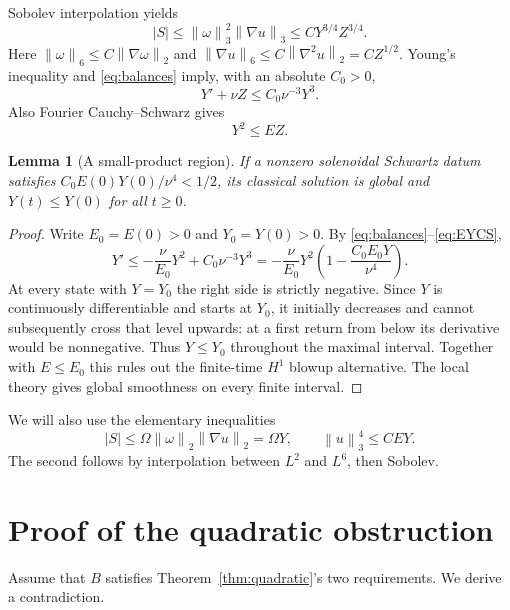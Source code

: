 \documentclass[11pt]{article}
\newtheorem{lemma}[theorem]{Lemma}
\theoremstyle{remark}
\newcommand{\norm}[1]{\left\lVert#1\right\rVert}
\begin{document}
Sobolev interpolation yields
\begin{equation}
 |S|\le \norm\omega_3^2\norm{\nabla u}_3
       \le C Y^{3/4}Z^{3/4}.
\end{equation}
Here $\norm\omega_6\le C\norm{\nabla\omega}_2$ and
$\norm{\nabla u}_6\le C\norm{\nabla^2u}_2=C Z^{1/2}$.
Young's inequality and \eqref{eq:balances} imply, with an absolute $C_0>0$,
\begin{equation}
 Y'+\nu Z\le C_0\nu^{-3}Y^3.\label{eq:enstrophy-inequality}
\end{equation}
Also Fourier Cauchy--Schwarz gives
\begin{equation}
 Y^2\le EZ.\label{eq:EYCS}
\end{equation}

\begin{lemma}[A small-product region]\label{lem:small}
If a nonzero solenoidal Schwartz datum satisfies
$C_0E(0)Y(0)/\nu^4<1/2$, its classical solution is global and
$Y(t)\le Y(0)$ for all $t\ge0$.
\end{lemma}
\begin{proof}
Write $E_0=E(0)>0$ and $Y_0=Y(0)>0$. By
\eqref{eq:balances}--\eqref{eq:EYCS},
\begin{equation}
 Y'\le -\frac{\nu}{E_0}Y^2+C_0\nu^{-3}Y^3
       =-\frac{\nu}{E_0}Y^2
          \left(1-\frac{C_0E_0Y}{\nu^4}\right).\label{eq:barrier}
\end{equation}
At every state with $Y=Y_0$ the right side is strictly negative. Since
$Y$ is continuously differentiable and starts at $Y_0$, it initially
decreases and cannot subsequently cross that level upwards: at a first
return from below its derivative would be nonnegative. Thus $Y\le Y_0$
throughout the maximal interval. Together with $E\le E_0$ this rules out
the finite-time $H^1$ blowup alternative. The local theory gives global
smoothness on every finite interval.
\end{proof}

We will also use the elementary inequalities
\begin{equation}
 |S|\le\Omega\norm\omega_2\norm{\nabla u}_2=\Omega Y,
 \qquad \norm u_3^4\le C E Y.\label{eq:comparison}
\end{equation}
The second follows by interpolation between $L^2$ and $L^6$, then Sobolev.

\section{Proof of the quadratic obstruction}\label{sec:quadratic}
Assume that $B$ satisfies Theorem~\ref{thm:quadratic}'s two requirements.
We derive a contradiction.
\end{document}

